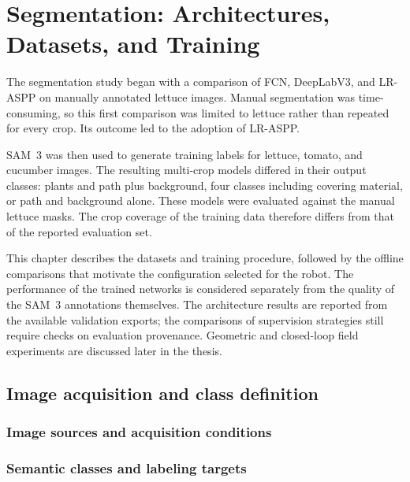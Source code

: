 \chapter{Segmentation: Architectures, Datasets, and Training}
\label{cap:segmentation}

The segmentation study began with a comparison of FCN, DeepLabV3, and
LR-ASPP on manually annotated lettuce images. Manual segmentation was
time-consuming, so this first comparison was limited to lettuce rather
than repeated for every crop. Its outcome led to the adoption of LR-ASPP.

SAM~3 was then used to generate training labels for lettuce, tomato, and
cucumber images. The resulting multi-crop models differed in their output
classes: plants and path plus background, four classes including covering
material, or path and background alone. These models were evaluated
against the manual lettuce masks. The crop coverage of the training data
therefore differs from that of the reported evaluation set.

This chapter describes the datasets and training procedure, followed by
the offline comparisons that motivate the configuration selected for the
robot. The performance of the trained networks is considered separately
from the quality of the SAM~3 annotations themselves. The architecture results are reported from the available validation
exports; the comparisons of supervision strategies still require checks
on evaluation provenance. Geometric and closed-loop field experiments
are discussed later in the thesis.

\section{Image acquisition and class definition}
\label{sec:c4_acquisition_classes}

\subsection{Image sources and acquisition conditions}
\label{subsec:c4_image_acquisition}


\subsection{Semantic classes and labeling targets}
\label{subsec:c4_semantic_classes}

